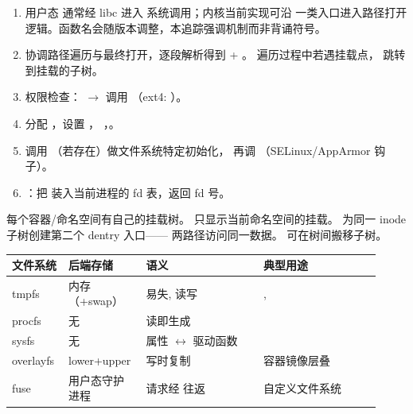 \begin{filesystemlayout}

\begin{enumerate}\tightlist
\item 用户态  通常经 libc 进入  系统调用；内核当前实现可沿
   一类入口进入路径打开逻辑。函数名会随版本调整，本追踪强调机制而非背诵符号。
\item {} 协调路径遍历与最终打开，逐段解析得到  + 。
  遍历过程中若遇挂载点， 跳转到挂载的子树。
\item 权限检查：
  $\rightarrow$ 调用 （ext4: ）。
\item 分配 ，设置 ，
  ，。
\item 调用 （若存在）做文件系统特定初始化，
  再调 （SELinux/AppArmor 钩子）。
\item {}：把  装入当前进程的 fd 表，返回 fd 号。
\end{enumerate}


每个容器/命名空间有自己的挂载树。 只显示当前命名空间的挂载。
 为同一 inode 子树创建第二个 dentry 入口——
两路径访问同一数据。 可在树间搬移子树。


\begin{longtable}{|F{0.14\linewidth}|F{0.18\linewidth}|F{0.30\linewidth}|F{0.30\linewidth}|}
\toprule
{}
\textbf{文件系统} & \textbf{后端存储} & \textbf{语义} & \textbf{典型用途} \\
\midrule
tmpfs    & 内存（+swap） & 易失, 读写   & ,  \\\tablerowrule
procfs   & 无            & 读即生成     &  \\\tablerowrule
sysfs    & 无            & 属性 $\leftrightarrow$ 驱动函数 &  \\\tablerowrule
overlayfs & lower+upper  & 写时复制     & 容器镜像层叠 \\\tablerowrule
fuse     & 用户态守护进程 & 请求经  往返 & 自定义文件系统 \\
\bottomrule
\end{longtable}


\end{filesystemlayout}
